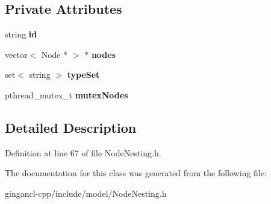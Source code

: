 \subsection*{Private Attributes}
\begin{CompactItemize}
\item 
string {\bf id}\label{classbr_1_1pucrio_1_1telemidia_1_1ginga_1_1ncl_1_1model_1_1components_1_1NodeNesting_d97b05b88ce9080f35b157cfacc8eb69}

\item 
vector$<$ Node $\ast$ $>$ $\ast$ {\bf nodes}\label{classbr_1_1pucrio_1_1telemidia_1_1ginga_1_1ncl_1_1model_1_1components_1_1NodeNesting_deb7e2f5c1f07da45bfd48d4bd964572}

\item 
set$<$ string $>$ {\bf typeSet}\label{classbr_1_1pucrio_1_1telemidia_1_1ginga_1_1ncl_1_1model_1_1components_1_1NodeNesting_145b3afaa194308141d367cc1393d565}

\item 
pthread\_\-mutex\_\-t {\bf mutexNodes}\label{classbr_1_1pucrio_1_1telemidia_1_1ginga_1_1ncl_1_1model_1_1components_1_1NodeNesting_d74e9643ccc01c4a63f5b602c246c2ae}

\end{CompactItemize}


\subsection{Detailed Description}




Definition at line 67 of file NodeNesting.h.

The documentation for this class was generated from the following file:\begin{CompactItemize}
\item 
gingancl-cpp/include/model/NodeNesting.h\end{CompactItemize}
